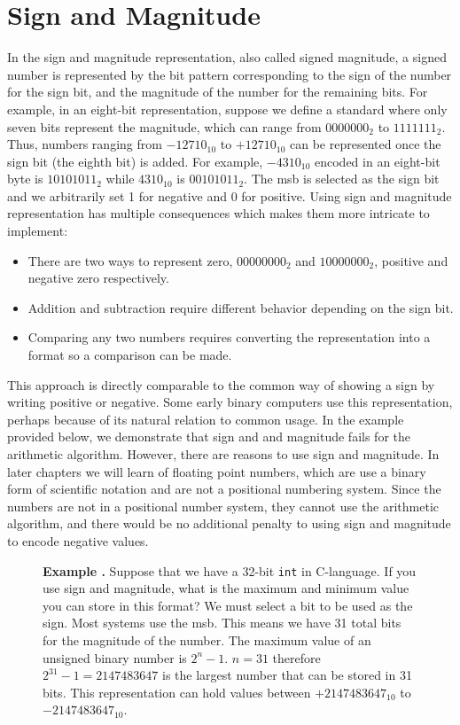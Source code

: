 \documentclass[letterpaper, 12pt]{book}
\newcommand*{\example}[1]{\noindent
    \colorbox{blue!10}{\noindent
        \begin{minipage}{\textwidth}
            \textbf{Example \thechapter.\arabic{examples}}\stepcounter{examples}
            #1
        \end{minipage}
    }
}
\begin{document}
\section{Sign and Magnitude\label{sec:signmag}}

In the \gls{sign and magnitude} representation, also called signed magnitude, a signed number is represented by the bit 
pattern corresponding to the sign of the number for the sign bit, and the \gls{magnitude} of the number for the remaining %
bits. For example, in an eight-bit representation, suppose we define a standard where only seven bits represent the magnitude, 
which can range from $0000000_2$ to $1111111_2$. Thus, numbers ranging from $-12710_{10}$ to $+12710_{10}$ can be represented 
once the sign bit (the eighth bit) is added. For example, $-4310_{10}$ encoded in an eight-bit byte is $10101011_2$ while 
$4310_{10}$ is $00101011_2$. The \gls{msb} is selected as the sign bit and we arbitrarily set 1 for negative and 0 for 
positive. Using sign and magnitude representation has multiple consequences which makes them more intricate to implement:

\begin{itemize}
    \item There are two ways to represent zero, $00000000_2$ and $10000000_2$, positive and negative zero respectively.
    \item Addition and subtraction require different behavior depending on the sign bit.
    \item Comparing any two numbers requires converting the representation into a format so a comparison can be made.
\end{itemize}

This approach is directly comparable to the common way of showing a sign by writing positive or negative. Some early 
binary computers use this representation, perhaps because of its natural relation to common usage. In the example 
provided below, we demonstrate that sign and and magnitude fails for the arithmetic algorithm.%
%
However, there are reasons to use sign and magnitude. In later chapters we will learn of \glspl{floating point number}, which 
are use a binary form of scientific notation %
 and are not a positional numbering system. Since the numbers are not in a positional number system, they cannot 
 use the arithmetic algorithm, and there would be no additional penalty to using sign and magnitude to encode 
negative values. 

\begin{figure}[h!]
    \example{%
        Suppose that we have a 32-bit \texttt{int} in C-language. If you use sign and magnitude, what is the maximum %
        and minimum value you can store in this format? %
        We must select a bit to be used as the sign. Most systems use the \gls{msb}. This means we have 31 total bits  %
        for the magnitude of the number. The maximum value of an unsigned binary number is $2^n-1$. $n=31$ therefore %
        $2^31-1=2147483647$ is the largest number that can be stored in 31 bits. This representation can hold values %
        between $+2147483647_{10}$ to $-2147483647_{10}$. %
    }
\end{figure}
\end{document}
